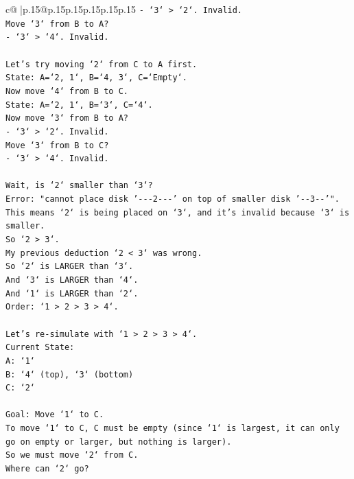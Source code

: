 \documentclass{article}
\begin{document}
{\begin{supertabular}{c@{$\;$}|p{.15\linewidth}@{}p{.15\linewidth}p{.15\linewidth}p{.15\linewidth}p{.15\linewidth}p{.15\linewidth}}
{{{\texttt{{-} `3` > `2`. Invalid.} \\
\texttt{Move `3` from B to A?} \\
\texttt{{-} `3` > `4`. Invalid.} \\
\\ 
\texttt{Let's try moving `2` from C to A first.} \\
\texttt{State: A=`2, 1`, B=`4, 3`, C=`Empty`.} \\
\texttt{Now move `4` from B to C.} \\
\texttt{State: A=`2, 1`, B=`3`, C=`4`.} \\
\texttt{Now move `3` from B to A?} \\
\texttt{{-} `3` > `2`. Invalid.} \\
\texttt{Move `3` from B to C?} \\
\texttt{{-} `3` > `4`. Invalid.} \\
\\ 
\texttt{Wait, is `2` smaller than `3`?} \\
\texttt{Error: "cannot place disk '{-}{-}{-}2{-}{-}{-}' on top of smaller disk '{-}{-}3{-}{-}'".} \\
\texttt{This means `2` is being placed on `3`, and it's invalid because `3` is smaller.} \\
\texttt{So `2 > 3`.} \\
\texttt{My previous deduction `2 < 3` was wrong.} \\
\texttt{So `2` is LARGER than `3`.} \\
\texttt{And `3` is LARGER than `4`.} \\
\texttt{And `1` is LARGER than `2`.} \\
\texttt{Order: `1 > 2 > 3 > 4`.} \\
\\ 
\texttt{Let's re{-}simulate with `1 > 2 > 3 > 4`.} \\
\texttt{Current State:} \\
\texttt{A: `1`} \\
\texttt{B: `4` (top), `3` (bottom)} \\
\texttt{C: `2`} \\
\\ 
\texttt{Goal: Move `1` to C.} \\
\texttt{To move `1` to C, C must be empty (since `1` is largest, it can only go on empty or larger, but nothing is larger).} \\
\texttt{So we must move `2` from C.} \\
\texttt{Where can `2` go?} \\
}}}
\end{supertabular}}
\end{document}
